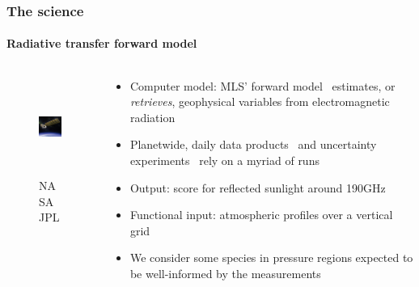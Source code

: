 \documentclass{snedecorbeamer}
\begin{document}
\begin{frame}[c]
  \frametitle{The science}
  \framesubtitle{Radiative transfer forward model}

  \begin{columns}[c]
    \begin{column}{0.2\textwidth}
      \begin{figure}
        \centering
        \includegraphics[height=8.5em]{inc/mls_aura}
        \caption*{
          \href{https://www.jpl.nasa.gov/missions/microwave-limb-sounder-mls}{}
          NASA JPL}
      \end{figure}
    \end{column}
    \begin{column}{0.7\textwidth}
      \begin{itemize}
      \item Computer model: MLS' forward
        model~\cite{read2006,schwartz2006,waters2006} estimates, or
        \emph{retrieves}, geophysical variables from electromagnetic radiation
      \item Planetwide, daily data products~\cite{liversey2020} and uncertainty
        experiments~\cite{turmon2019,braverman2021} rely on a myriad of runs
      \item Output: score for reflected sunlight around 190GHz~\cite{johnson2020}
      \item Functional input: atmospheric profiles over a vertical grid
      \item We consider some species in pressure regions expected to be
        well-informed by the measurements~\cite{liversey2020}
      \end{itemize}
    \end{column}
  \end{columns}
\end{frame}
\end{document}
